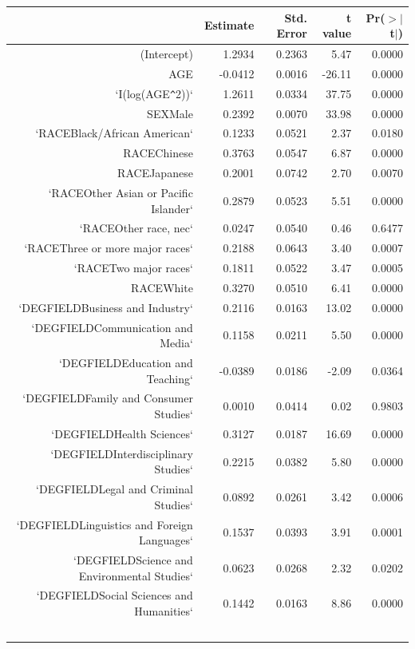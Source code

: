 \documentclass{article}
\begin{document}
\begin{table}[ht]
    \begin{tabular}{rrrrr}
      \hline
     & Estimate & Std. Error & t value & Pr($>$$|$t$|$) \\ 
      \hline
    (Intercept) & 1.2934 & 0.2363 & 5.47 & 0.0000 \\ 
      AGE & -0.0412 & 0.0016 & -26.11 & 0.0000 \\ 
      `I(log(AGE\verb|^|2))` & 1.2611 & 0.0334 & 37.75 & 0.0000 \\ 
      SEXMale & 0.2392 & 0.0070 & 33.98 & 0.0000 \\ 
      `RACEBlack/African American` & 0.1233 & 0.0521 & 2.37 & 0.0180 \\ 
      RACEChinese & 0.3763 & 0.0547 & 6.87 & 0.0000 \\ 
      RACEJapanese & 0.2001 & 0.0742 & 2.70 & 0.0070 \\ 
      `RACEOther Asian or Pacific Islander` & 0.2879 & 0.0523 & 5.51 & 0.0000 \\ 
      `RACEOther race, nec` & 0.0247 & 0.0540 & 0.46 & 0.6477 \\ 
      `RACEThree or more major races` & 0.2188 & 0.0643 & 3.40 & 0.0007 \\ 
      `RACETwo major races` & 0.1811 & 0.0522 & 3.47 & 0.0005 \\ 
      RACEWhite & 0.3270 & 0.0510 & 6.41 & 0.0000 \\ 
      `DEGFIELDBusiness and Industry` & 0.2116 & 0.0163 & 13.02 & 0.0000 \\ 
      `DEGFIELDCommunication and Media` & 0.1158 & 0.0211 & 5.50 & 0.0000 \\ 
      `DEGFIELDEducation and Teaching` & -0.0389 & 0.0186 & -2.09 & 0.0364 \\ 
      `DEGFIELDFamily and Consumer Studies` & 0.0010 & 0.0414 & 0.02 & 0.9803 \\ 
      `DEGFIELDHealth Sciences` & 0.3127 & 0.0187 & 16.69 & 0.0000 \\ 
      `DEGFIELDInterdisciplinary Studies` & 0.2215 & 0.0382 & 5.80 & 0.0000 \\ 
      `DEGFIELDLegal and Criminal Studies` & 0.0892 & 0.0261 & 3.42 & 0.0006 \\ 
      `DEGFIELDLinguistics and Foreign Languages` & 0.1537 & 0.0393 & 3.91 & 0.0001 \\ 
      `DEGFIELDScience and Environmental Studies` & 0.0623 & 0.0268 & 2.32 & 0.0202 \\ 
      `DEGFIELDSocial Sciences and Humanities` & 0.1442 & 0.0163 & 8.86 & 0.0000 \\ 
$$
\end{tabular}
\end{table}
\end{document}
